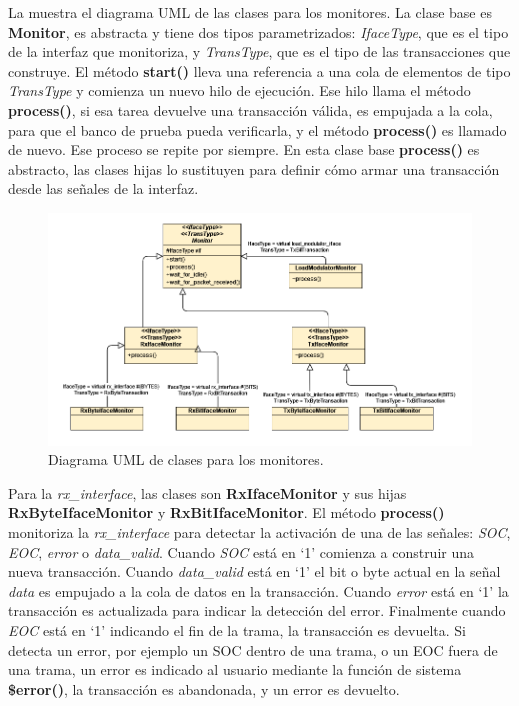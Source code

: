 \documentclass[a4paper, twoside, 11pt]{report}
\begin{document}
La  muestra el diagrama UML de las clases para los monitores. La clase base es \textbf{Monitor}, es abstracta y tiene dos tipos parametrizados: \textit{IfaceType}, que es el tipo de la interfaz que monitoriza, y \textit{TransType}, que es el tipo de las transacciones que construye. El método \textbf{start()} lleva una referencia a una cola de elementos de tipo \textit{TransType} y comienza un nuevo hilo de ejecución. Ese hilo llama el método \textbf{process()}, si esa tarea devuelve una transacción válida, es empujada a la cola, para que el banco de prueba pueda verificarla, y el método \textbf{process()} es llamado de nuevo. Ese proceso se repite por siempre. En esta clase base \textbf{process()} es abstracto, las clases hijas lo sustituyen para definir cómo armar una transacción desde las señales de la interfaz.

\vfill

\begin{figure}[htb]
  \centering
  \includegraphics[width=1.0\textwidth]{./img/monitors_uml.vpd}
  \caption{Diagrama UML de clases para los monitores.}
  \label{fig:monitor_uml}
\end{figure}

Para la \textit{rx\_interface}, las clases son \textbf{RxIfaceMonitor} y sus hijas \textbf{RxByteIfaceMonitor} y \textbf{RxBitIfaceMonitor}. El método \textbf{process()} monitoriza la \textit{rx\_interface} para detectar la activación de una de las señales: \textit{SOC}, \textit{EOC}, \textit{error} o \textit{data\_valid}. Cuando \textit{SOC} está en ‘1’ comienza a construir una nueva transacción. Cuando \textit{data\_valid} está en ‘1’ el bit o byte actual en la señal \textit{data} es empujado a la cola de datos en la transacción. Cuando \textit{error} está en ‘1’ la transacción es actualizada para indicar la detección del error. Finalmente cuando \textit{EOC} está en ‘1’ indicando el fin de la trama, la transacción es devuelta. Si detecta un error, por ejemplo un SOC dentro de una trama, o un EOC fuera de una trama, un error es indicado al usuario mediante la función de sistema \textbf{\$error()}, la transacción es abandonada, y un error es devuelto.
\end{document}
